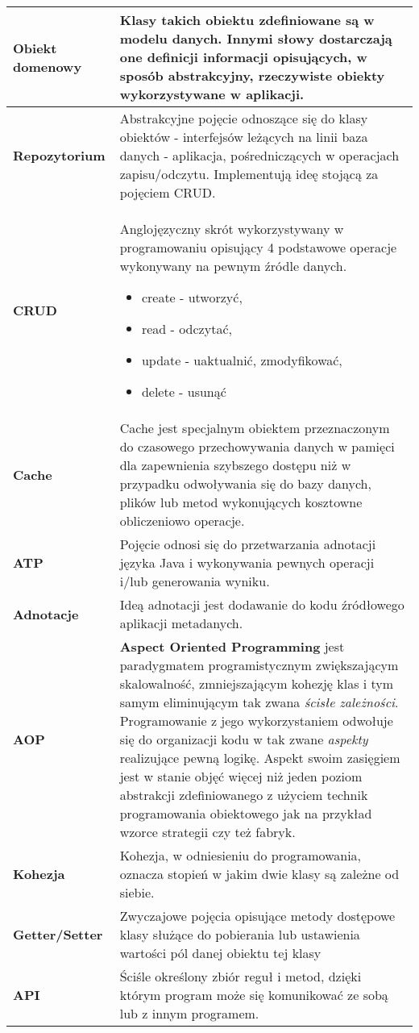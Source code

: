\begin{center}
\begin{longtable}{| p{3cm} | p{13cm} |}
		\textbf{Obiekt domenowy}								&
		\label{concept:domain_object}
		Klasy takich obiektu zdefiniowane są w modelu danych. 
		Innymi słowy dostarczają one definicji informacji 
		opisujących, w sposób abstrakcyjny, 
		rzeczywiste obiekty wykorzystywane w aplikacji.	
		\tabularnewline
		\hline
		\textbf{Repozytorium}									&
		\label{concept:repository}
		Abstrakcyjne pojęcie odnoszące się do klasy obiektów - interfejsów leżących na linii
		baza danych - aplikacja, pośredniczących w operacjach zapisu/odczytu. Implementują ideę
		stojącą za pojęciem CRUD.
		\tabularnewline
		\hline
		\textbf{CRUD}
		\label{concept:crud}									&
		Anglojęzyczny skrót wykorzystywany w programowaniu opisujący 4 podstawowe operacje wykonywany
		na pewnym źródle danych. 
		\begin{itemize}
			\item create - utworzyć,
			\item read - odczytać,
			\item update - uaktualnić, zmodyfikować, 
			\item delete - usunąć
		\end{itemize}	
		\tabularnewline
		\hline
		\textbf{Cache}											&
		\label{concept:cache}
		Cache jest specjalnym obiektem przeznaczonym do czasowego przechowywania danych
		w pamięci dla zapewnienia szybszego dostępu niż w przypadku odwoływania się do 
		bazy danych, plików lub metod wykonujących kosztowne 
		obliczeniowo operacje.
		\tabularnewline
		\hline
		\textbf{ATP}											&
		\label{concept:atp}
		Pojęcie odnosi się do przetwarzania adnotacji języka Java i wykonywania pewnych operacji
		i/lub generowania wyniku.
		\tabularnewline
		\hline
		\textbf{Adnotacje}										&
		\label{concept:annotation}
		Ideą adnotacji jest dodawanie do kodu źródłowego 
		aplikacji metadanych.
		\tabularnewline
		\hline
		\textbf{AOP}											&
		\label{concept:aop}
		\textbf{Aspect Oriented Programming} jest paradygmatem programistycznym zwiększającym
		skalowalność, zmniejszającym kohezję klas i tym samym eliminującym tak zwana \textit{ścisłe zależności}. 
		Programowanie z jego wykorzystaniem odwołuje się do organizacji kodu w tak zwane \textit{aspekty} realizujące
		pewną logikę. Aspekt swoim zasięgiem jest w stanie objęć więcej niż jeden poziom abstrakcji
		zdefiniowanego z użyciem technik programowania obiektowego jak na przykład wzorce strategii 
		czy też fabryk.
		\tabularnewline
		\hline 
		\textbf{Kohezja}										&
		\label{concept:cohesion}
		Kohezja, w odniesieniu do programowania, 
		oznacza stopień w jakim dwie klasy są zależne 
		od siebie.
		\tabularnewline
		\hline 
		\textbf{Getter/Setter}									&
		\label{concept:getter_setter}
		Zwyczajowe pojęcia opisujące metody 
		dostępowe klasy służące do pobierania lub ustawienia 
		wartości pól danej obiektu tej klasy
		\tabularnewline
		\hline
		\textbf{API}											&
		\label{concept:api}
		Ściśle określony zbiór reguł i metod, dzięki którym program może się komunikować ze sobą lub z innym programem.
		\label{concept:api}  
	\end{longtable}
	\label{app:ehcache:spring_caches}
\end{center}